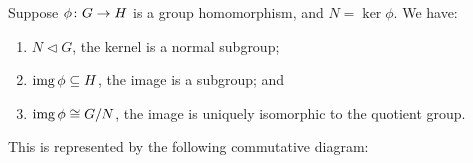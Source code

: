 \begin{theorem}\label{thm:iso-1-group}
    Suppose \(\phi\colon G\to H\) is a group homomorphism,
    and \(N = \ker\phi\).
    We have:
    \begin{enumerate}[label={(\alph*)}, itemsep=0mm]
        \item \(N \lhd G\), the kernel is a normal subgroup;
        \item \(\operatorname{img}\phi \subseteq H\), the image is a subgroup; and
        \item \(\operatorname{img}\phi \cong G/N\),
            the image is uniquely isomorphic to the quotient group.
    \end{enumerate}

    This is represented by the following commutative diagram:
    \begin{center}
    \end{center}
\end{theorem}
